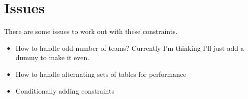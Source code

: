 \documentclass[letterpaper,11pt]{report}
\begin{document}
\FloatBarrier
\section{Issues}
There are some issues to work out with these constraints.
\begin{itemize}
\item How to handle odd number of teams? Currently I'm thinking I'll just
  add a dummy to make it even.
\item How to handle alternating sets of tables for performance
\item Conditionally adding constraints
\end{itemize}
\end{document}
